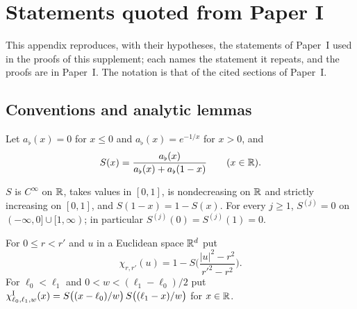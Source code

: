 \section{Statements quoted from Paper I}\label{p2:sec-quoted}

This appendix reproduces, with their hypotheses, the statements of Paper~I \cite{PaperI} used in the proofs of
this supplement; each names the statement it repeats, and the proofs are in Paper~I. The notation is that of the
cited sections of Paper~I.

\subsection{Conventions and analytic lemmas}

\begin{definition}\label{I:def:pre-flat}
Let $a_\flat(x)=0$ for $x\le0$ and $a_\flat(x)=e^{-1/x}$ for $x>0$, and
\[
 S(x)=\frac{a_\flat(x)}{a_\flat(x)+a_\flat(1-x)}\qquad(x\in\mathbb{R}).
\]
\end{definition}

\begin{lemma}\label{I:lem:pre-flat}
$S$ is $C^\infty$ on $\mathbb{R}$, takes values in $[0,1]$, is nondecreasing on $\mathbb{R}$ and strictly increasing on
$[0,1]$, and $S(1-x)=1-S(x)$. For every $j\ge1$, $S^{(j)}=0$ on $(-\infty,0]\cup[1,\infty)$; in particular
$S^{(j)}(0)=S^{(j)}(1)=0$.
\end{lemma}

\begin{definition}\label{I:def:pre-cutoff}
For $0\le r<r'$ and $u$ in a Euclidean space $\mathbb{R}^d$ put
\[
 \chi_{r,r'}(u)=1-S\Big(\frac{|u|^2-r^2}{r'^2-r^2}\Big).
\]
For $\ell_0<\ell_1$ and $0<w<(\ell_1-\ell_0)/2$ put
$\chi^{\rm I}_{\ell_0,\ell_1,w}(x)=S\big((x-\ell_0)/w\big)\,S\big((\ell_1-x)/w\big)$ for $x\in\mathbb{R}$.
\end{definition}

